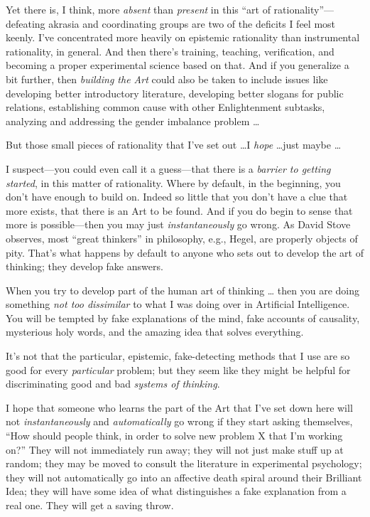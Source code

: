 {
 Yet there is, I think, more \textit{absent} than \textit{present}
in this ``art of
rationality''---defeating akrasia and coordinating
groups are two of the deficits I feel most keenly. I've
concentrated more heavily on epistemic rationality than instrumental
rationality, in general. And then there's training,
teaching, verification, and becoming a proper experimental science
based on that. And if you generalize a bit further, then
\textit{building the Art} could also be taken to include issues like
developing better introductory literature, developing better slogans
for public relations, establishing common cause with other
Enlightenment subtasks, analyzing and addressing the gender imbalance
problem \ldots}

{
 But those small pieces of rationality that I've
set out \ldots I \textit{hope} \ldots just maybe \ldots}

{
 I suspect---you could even call it a guess---that there is a
\textit{barrier to getting started}, in this matter of rationality.
Where by default, in the beginning, you don't have
enough to build on. Indeed so little that you don't
have a clue that more exists, that there is an Art to be found. And if
you do begin to sense that more is possible---then you may just
\textit{instantaneously} go wrong. As David Stove observes, most
``great thinkers'' in philosophy,
e.g., Hegel, are properly objects of pity.
That's what happens by default to anyone who sets out
to develop the art of thinking; they develop fake answers.}

{
 When you try to develop part of the human art of thinking \ldots
then you are doing something \textit{not too dissimilar} to what I was
doing over in Artificial Intelligence. You will be tempted by fake
explanations of the mind, fake accounts of causality, mysterious holy
words, and the amazing idea that solves everything.}

{
 It's not that the particular, epistemic,
fake-detecting methods that I use are so good for every
\textit{particular} problem; but they seem like they might be helpful
for discriminating good and bad \textit{systems of thinking}.}

{
 I hope that someone who learns the part of the Art that
I've set down here will not \textit{instantaneously}
and \textit{automatically} go wrong if they start asking themselves,
``How should people think, in order to solve new
problem X that I'm working on?'' They
will not immediately run away; they will not just make stuff up at
random; they may be moved to consult the literature in experimental
psychology; they will not automatically go into an affective death
spiral around their Brilliant Idea; they will have some idea of what
distinguishes a fake explanation from a real one. They will get a
saving throw.}

